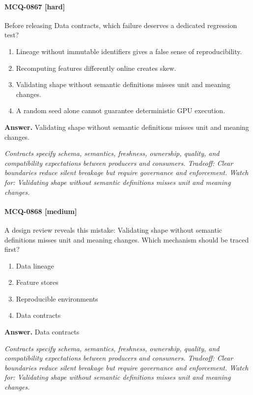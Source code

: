 \paragraph{MCQ-0867 [hard]} Before releasing Data contracts, which failure deserves a dedicated regression test?
\begin{enumerate}[label=\Alph*.]
\item Lineage without immutable identifiers gives a false sense of reproducibility.
\item Recomputing features differently online creates skew.
\item Validating shape without semantic definitions misses unit and meaning changes.
\item A random seed alone cannot guarantee deterministic GPU execution.
\end{enumerate}
\noindent\textbf{Answer.} Validating shape without semantic definitions misses unit and meaning changes.
\par\textit{Contracts specify schema, semantics, freshness, ownership, quality, and compatibility expectations between producers and consumers. Tradeoff: Clear boundaries reduce silent breakage but require governance and enforcement. Watch for: Validating shape without semantic definitions misses unit and meaning changes.}
\paragraph{MCQ-0868 [medium]} A design review reveals this mistake: Validating shape without semantic definitions misses unit and meaning changes. Which mechanism should be traced first?
\begin{enumerate}[label=\Alph*.]
\item Data lineage
\item Feature stores
\item Reproducible environments
\item Data contracts
\end{enumerate}
\noindent\textbf{Answer.} Data contracts
\par\textit{Contracts specify schema, semantics, freshness, ownership, quality, and compatibility expectations between producers and consumers. Tradeoff: Clear boundaries reduce silent breakage but require governance and enforcement. Watch for: Validating shape without semantic definitions misses unit and meaning changes.}
